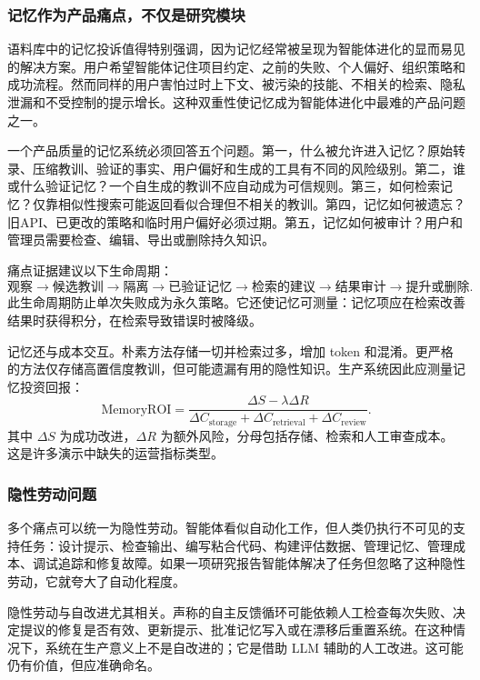 \subsubsection{记忆作为产品痛点，不仅是研究模块}
\label{sec:ch7-memory-product-pain}

语料库中的记忆投诉值得特别强调，因为记忆经常被呈现为智能体进化的显而易见的解决方案。用户希望智能体记住项目约定、之前的失败、个人偏好、组织策略和成功流程。然而同样的用户害怕过时上下文、被污染的技能、不相关的检索、隐私泄漏和不受控制的提示增长。这种双重性使记忆成为智能体进化中最难的产品问题之一。

一个产品质量的记忆系统必须回答五个问题。第一，什么被允许进入记忆？原始转录、压缩教训、验证的事实、用户偏好和生成的工具有不同的风险级别。第二，谁或什么验证记忆？一个自生成的教训不应自动成为可信规则。第三，如何检索记忆？仅靠相似性搜索可能返回看似合理但不相关的教训。第四，记忆如何被遗忘？旧API、已更改的策略和临时用户偏好必须过期。第五，记忆如何被审计？用户和管理员需要检查、编辑、导出或删除持久知识。

痛点证据建议以下生命周期：
\[
  \text{观察} \rightarrow \text{候选教训} \rightarrow \text{隔离} \rightarrow \text{已验证记忆} \rightarrow \text{检索的建议} \rightarrow \text{结果审计} \rightarrow \text{提升或删除}.
\]
此生命周期防止单次失败成为永久策略。它还使记忆可测量：记忆项应在检索改善结果时获得积分，在检索导致错误时被降级。

记忆还与成本交互。朴素方法存储一切并检索过多，增加 token 和混淆。更严格的方法仅存储高置信度教训，但可能遗漏有用的隐性知识。生产系统因此应测量记忆投资回报：
\[
  \mathrm{MemoryROI} = \frac{\Delta S - \lambda \Delta R}{\Delta C_{\mathrm{storage}} + \Delta C_{\mathrm{retrieval}} + \Delta C_{\mathrm{review}}}.
\]
其中 $\Delta S$ 为成功改进，$\Delta R$ 为额外风险，分母包括存储、检索和人工审查成本。这是许多演示中缺失的运营指标类型。

\subsubsection{隐性劳动问题}
\label{sec:ch7-hidden-labor}

多个痛点可以统一为隐性劳动。智能体看似自动化工作，但人类仍执行不可见的支持任务：设计提示、检查输出、编写粘合代码、构建评估数据、管理记忆、管理成本、调试追踪和修复故障。如果一项研究报告智能体解决了任务但忽略了这种隐性劳动，它就夸大了自动化程度。

隐性劳动与自改进尤其相关。声称的自主反馈循环可能依赖人工检查每次失败、决定提议的修复是否有效、更新提示、批准记忆写入或在漂移后重置系统。在这种情况下，系统在生产意义上不是自改进的；它是借助 LLM 辅助的人工改进。这可能仍有价值，但应准确命名。

